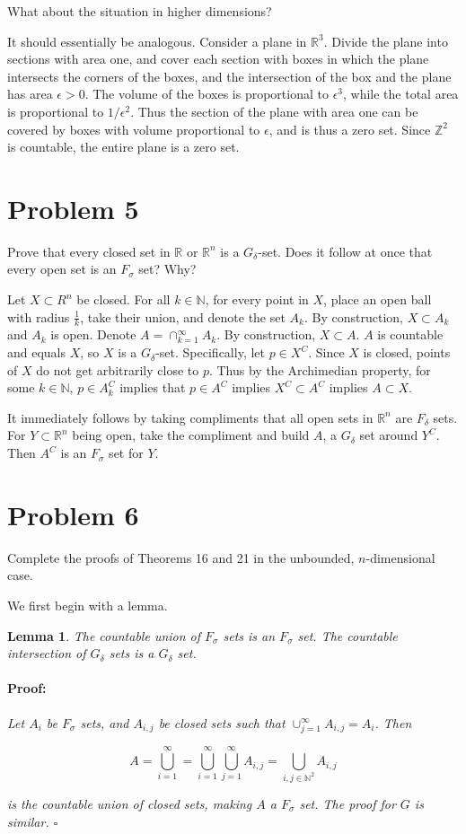 \documentclass{article}
\newenvironment{proof}{\paragraph{Proof:}}{\hfill$\square$}
\newtheorem{lemma}[theorem]{Lemma}
\newcommand{\R}{\mathbb{R}}
\newcommand{\Z}{\mathbb{Z}}
\newcommand{\N}{\mathbb{N}}
\begin{document}
What about the situation in higher dimensions?

It should essentially be analogous. Consider a plane in $\R^3$.  Divide the plane into sections with area one, and cover each section with boxes in which the plane intersects the corners of the boxes, and the intersection of the box and the plane has area $\epsilon > 0$. The volume of the boxes is proportional to $\epsilon^3$, while the total area is proportional to $1/\epsilon^2$. Thus the section of the plane with area one can be covered by boxes with volume proportional to $\epsilon$, and is thus a zero set. Since $\Z^2$ is countable, the entire plane is a zero set.

\section*{Problem 5}

Prove that every closed set in $\R$ or $\R^n$ is a $G_\delta$-set. Does it follow at once that every open set is an $F_\sigma$ set? Why?

Let $X \subset R^n$ be closed. For all $k \in \N$, for every point in $X$, place an open ball with radius $\frac{1}{k}$, take their union, and denote the set $A_k$. By construction, $X \subset A_k$ and $A_k$ is open. Denote $A = \cap_{k=1}^\infty A_k$. By construction, $X \subset A$. $A$ is countable and equals $X$, so $X$ is a $G_\delta$-set. Specifically, let $p \in X^C$. Since $X$ is closed, points of $X$ do not get arbitrarily close to $p$. Thus by the Archimedian property, for some $k \in \N$, $p \in A_k^C$ implies that $p \in A^C$ implies $X^C \subset A^C$ implies $A \subset X$.

It immediately follows by taking compliments that all open sets in $\R^n$ are $F_\delta$ sets. For $Y \subset \R^n$ being open, take the compliment and build $A$, a $G_\delta$ set around $Y^C$. Then $A^C$ is an $F_\sigma$ set for $Y$.

\section*{Problem 6}

Complete the proofs of Theorems 16 and 21 in the unbounded, $n$-dimensional case.

We first begin with a lemma.

\begin{lemma}
The countable union of $F_\sigma$ sets is an $F_\sigma$ set. The countable intersection of $G_\delta$ sets is a $G_\delta$ set.
\begin{proof}
Let $A_i$ be $F_\sigma$ sets, and $A_{i, j}$ be closed sets such that $\cup_{j=1}^\infty A_{i,j} = A_i$. Then

\[
A = \bigcup_{i=1}^\infty = \bigcup_{i=1}^\infty \bigcup_{j=1}^\infty A_{i,j} = \bigcup_{i,j \in \N^2} A_{i,j}
\]

is the countable union of closed sets, making $A$ a $F_\sigma$ set. The proof for $G$ is similar.
\end{proof}
\end{lemma}
\end{document}
